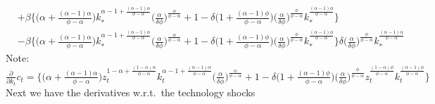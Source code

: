 \documentclass[a4paper]{article}
\theoremstyle{definition}
\begin{document}
\begin{align*}
												&+ \beta \Big\{ \Big( {\alpha+\frac{(\alpha-1)\alpha}{\phi-\alpha}} \Big)  k_{*}^{\alpha-1+\frac{(\alpha-1)\alpha}{\phi-\alpha}} \Big( \frac{\alpha}{\delta\phi} \Big)^{\frac{\alpha}{\phi-\alpha}} + 1 - \delta \Big( {1+\frac{(\alpha-1)\phi}{\phi-\alpha}} \Big) \Big( \frac{\alpha}{\delta\phi} \Big)^{\frac{\phi}{\phi-\alpha}} k_{*}^{\frac{(\alpha-1)\phi}{\phi-\alpha}} \Big\} \\
												&- \beta \Big\{ \Big( {\alpha+\frac{(\alpha-1)\alpha}{\phi-\alpha}} \Big) k_{*}^{\alpha-1+\frac{(\alpha-1)\alpha}{\phi-\alpha}} \Big( \frac{\alpha}{\delta\phi} \Big)^{\frac{\alpha}{\phi-\alpha}} + 1 - \delta \Big( {1+\frac{(\alpha-1)\phi}{\phi-\alpha}} \Big) \Big( \frac{\alpha}{\delta\phi} \Big)^{\frac{\phi}{\phi-\alpha}}k_{*}^{\frac{(\alpha-1)\phi}{\phi-\alpha}} \Big\} \delta \Big( \frac{\alpha}{\delta\phi} \Big)^{\frac{\phi}{\phi-\alpha}}k_{*}^{\frac{(\alpha-1)\alpha}{\phi-\alpha}}											
	\end{align*}	
Note: $\frac{\partial}{\partial k_t}c_t = \Big\{ \Big( {\alpha+\frac{(\alpha-1)\alpha}{\phi-\alpha}} \Big) z_{t}^{1-\alpha+\frac{(1-\alpha)\alpha}{\phi-\alpha}} k_{t}^{\alpha-1+\frac{(\alpha-1)\alpha}{\phi-\alpha}} \Big( \frac{\alpha}{\delta\phi} \Big)^{\frac{\alpha}{\phi-\alpha}} + 1 - \delta \Big( {1+\frac{(\alpha-1)\phi}{\phi-\alpha}} \Big) \Big( \frac{\alpha}{\delta\phi} \Big)^{\frac{\phi}{\phi-\alpha}}z_{t}^{\frac{(1-\alpha)\phi}{\phi-\alpha}}k_{t}^{\frac{(\alpha-1)\phi}{\phi-\alpha}} \Big\}$
Next we have the derivatives w.r.t.\ the technology shocks
\end{document}
